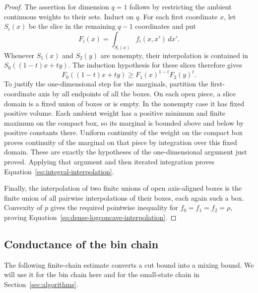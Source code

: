 \begin{proof}
The assertion for dimension $q=1$ follows by restricting the ambient
continuous weights to their sets.  Induct on $q$.  For each first
coordinate $x$, let $S_i(x)$ be the slice in the remaining $q-1$
coordinates and put
\[
 F_i(x)=\int_{S_i(x)}f_i(x,x')\,dx'.
\]
Whenever $S_1(x)$ and $S_2(y)$ are nonempty, their interpolation is
contained in $S_0((1-t)x+ty)$.  The induction hypothesis for these slices
therefore gives
\[
 F_0((1-t)x+ty)\ge F_1(x)^{1-t}F_2(y)^t.
\]
To justify the one-dimensional step for the marginals, partition the
first-coordinate axis by all endpoints of all the boxes.  On each open
piece, a slice domain is a fixed union of boxes or is empty.  In the
nonempty case it has fixed positive volume.  Each ambient weight has a
positive minimum and finite maximum on the compact box, so its marginal
is bounded above and below by positive constants there.  Uniform
continuity of the weight on the compact box proves continuity of the
marginal on that piece by integration over this fixed domain.  These are
exactly the hypotheses of the one-dimensional argument just proved.
Applying that argument and then iterated integration proves
Equation~\eqref{eq:integral-interpolation}.

Finally, the interpolation of two finite unions of open axis-aligned
boxes is the finite union of all pairwise interpolations of their boxes,
each again such a box.  Convexity of $p$ gives the required pointwise
inequality for $f_0=f_1=f_2=\rho$, proving
Equation~\eqref{eq:dense-logconcave-interpolation}.
\end{proof}

\subsection{Conductance of the bin chain}

The following finite-chain estimate converts a cut bound into a mixing
bound. We will use it for the bin chain here and for the small-state
chain in Section~\ref{sec:algorithms}.

